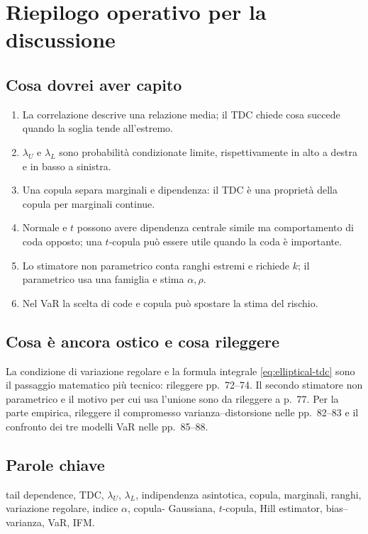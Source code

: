 \documentclass[11pt,a4paper]{article}
\begin{document}
\section{Riepilogo operativo per la discussione}

\subsection*{Cosa dovrei aver capito}
\begin{enumerate}[leftmargin=*]
  \item La correlazione descrive una relazione media; il TDC chiede cosa
  succede quando la soglia tende all'estremo.
  \item $\lambda_U$ e $\lambda_L$ sono probabilità condizionate limite,
  rispettivamente in alto a destra e in basso a sinistra.
  \item Una copula separa marginali e dipendenza: il TDC è una proprietà della
  copula per marginali continue.
  \item Normale e $t$ possono avere dipendenza centrale simile ma comportamento
  di coda opposto; una $t$-copula può essere utile quando la coda è importante.
  \item Lo stimatore non parametrico conta ranghi estremi e richiede $k$; il
  parametrico usa una famiglia e stima $\alpha,\rho$.
  \item Nel VaR la scelta di code e copula può spostare la stima del rischio.
\end{enumerate}

\subsection*{Cosa è ancora ostico e cosa rileggere}
La condizione di variazione regolare e la formula integrale
\eqref{eq:elliptical-tdc} sono il passaggio matematico più tecnico: rileggere
pp.~72--74. Il secondo stimatore non parametrico e il motivo per cui usa
l'unione sono da rileggere a p.~77. Per la parte empirica, rileggere il
compromesso varianza--distorsione nelle pp.~82--83 e il confronto dei tre
modelli VaR nelle pp.~85--88.

\subsection*{Parole chiave}
tail dependence, TDC, $\lambda_U$, $\lambda_L$, indipendenza asintotica,
copula, marginali, ranghi, variazione regolare, indice $\alpha$, copula-
Gaussiana, $t$-copula, Hill estimator, bias--varianza, VaR, IFM.
\end{document}
